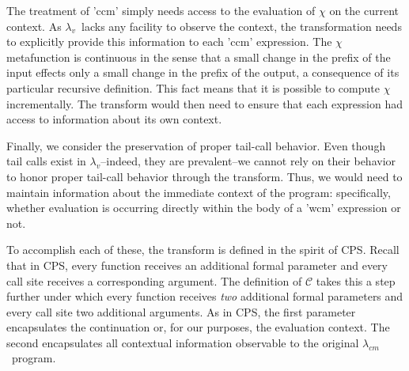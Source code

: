 \documentclass{llncs}
\newcommand{\cm}[0]{$\lambda_{cm}$}
\newcommand{\lv}[0]{$\lambda_v$}
\begin{document}
The treatment of \scheme'ccm' simply needs access to the evaluation of $\chi$ on the current context. As \lv\ lacks any facility to observe the context, the transformation needs to explicitly provide this information to each \scheme'ccm' expression. The $\chi$ metafunction is continuous in the sense that a small change in the prefix of the input effects only a small change in the prefix of the output, a consequence of its particular recursive definition. This fact means that it is possible to compute $\chi$ incrementally. The transform would then need to ensure that each expression had access to information about its own context.

Finally, we consider the preservation of proper tail-call behavior. Even though tail calls exist in \lv--indeed, they are prevalent--we cannot rely on their behavior to honor proper tail-call behavior through the transform. Thus, we would need to maintain information about the immediate context of the program: specifically, whether evaluation is occurring directly within the body of a \scheme'wcm' expression or not.

To accomplish each of these, the transform is defined in the spirit of CPS. Recall that in
CPS, every function receives an additional formal parameter and every call site receives a
corresponding argument. The definition of $\mathcal{C}$ takes this a step further under
which every function receives \emph{two} additional formal parameters and every call site
two additional arguments. As in CPS, the first parameter encapsulates the continuation or,
for our purposes, the evaluation context. The second encapsulates all contextual
information observable to the original \cm\ program.


\newtheorem{defn}{Definition}

\newenvironment{schemedefn}[1]{\begin{defn}$#1$}{\end{defn}}
\newenvironment{namedschemedefn}[2]{\begin{defn}\label{#1}$#2$}{\end{defn}}


\newcommand{\true}{\mathbf{true}}
\newcommand{\false}{\mathbf{false}}
\newcommand{\nil}{\mathbf{nil}}
\newcommand{\pair}[2]{((\mathbf{pair}\,#1)\,#2)}
\newcommand{\eval}[1]{\overline{#1}}
\end{document}
